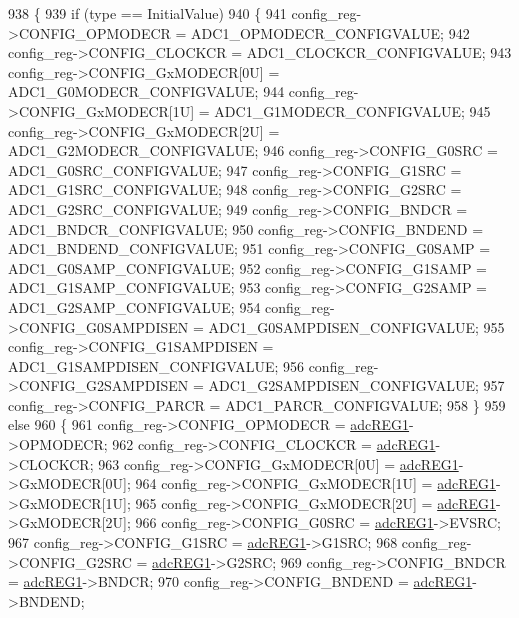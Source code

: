 \begin{DoxyCode}
938 \{
939     \textcolor{keywordflow}{if} (type == InitialValue)
940     \{
941         config\_reg->CONFIG\_OPMODECR = ADC1\_OPMODECR\_CONFIGVALUE;
942         config\_reg->CONFIG\_CLOCKCR = ADC1\_CLOCKCR\_CONFIGVALUE;
943         config\_reg->CONFIG\_GxMODECR[0U] = ADC1\_G0MODECR\_CONFIGVALUE;
944         config\_reg->CONFIG\_GxMODECR[1U] = ADC1\_G1MODECR\_CONFIGVALUE;
945         config\_reg->CONFIG\_GxMODECR[2U] = ADC1\_G2MODECR\_CONFIGVALUE;
946         config\_reg->CONFIG\_G0SRC = ADC1\_G0SRC\_CONFIGVALUE;
947         config\_reg->CONFIG\_G1SRC = ADC1\_G1SRC\_CONFIGVALUE;
948         config\_reg->CONFIG\_G2SRC = ADC1\_G2SRC\_CONFIGVALUE;
949         config\_reg->CONFIG\_BNDCR = ADC1\_BNDCR\_CONFIGVALUE;
950         config\_reg->CONFIG\_BNDEND = ADC1\_BNDEND\_CONFIGVALUE;
951         config\_reg->CONFIG\_G0SAMP = ADC1\_G0SAMP\_CONFIGVALUE;
952         config\_reg->CONFIG\_G1SAMP = ADC1\_G1SAMP\_CONFIGVALUE;
953         config\_reg->CONFIG\_G2SAMP = ADC1\_G2SAMP\_CONFIGVALUE;
954         config\_reg->CONFIG\_G0SAMPDISEN = ADC1\_G0SAMPDISEN\_CONFIGVALUE;
955         config\_reg->CONFIG\_G1SAMPDISEN = ADC1\_G1SAMPDISEN\_CONFIGVALUE;
956         config\_reg->CONFIG\_G2SAMPDISEN = ADC1\_G2SAMPDISEN\_CONFIGVALUE;
957         config\_reg->CONFIG\_PARCR = ADC1\_PARCR\_CONFIGVALUE;
958     \}
959     \textcolor{keywordflow}{else}
960     \{
961         config\_reg->CONFIG\_OPMODECR = \mbox{\hyperlink{reg__adc_8h_a3b9540af9f841ba3127f14b1c9208c57}{adcREG1}}->OPMODECR;
962         config\_reg->CONFIG\_CLOCKCR = \mbox{\hyperlink{reg__adc_8h_a3b9540af9f841ba3127f14b1c9208c57}{adcREG1}}->CLOCKCR;
963         config\_reg->CONFIG\_GxMODECR[0U] = \mbox{\hyperlink{reg__adc_8h_a3b9540af9f841ba3127f14b1c9208c57}{adcREG1}}->GxMODECR[0U];
964         config\_reg->CONFIG\_GxMODECR[1U] = \mbox{\hyperlink{reg__adc_8h_a3b9540af9f841ba3127f14b1c9208c57}{adcREG1}}->GxMODECR[1U];
965         config\_reg->CONFIG\_GxMODECR[2U] = \mbox{\hyperlink{reg__adc_8h_a3b9540af9f841ba3127f14b1c9208c57}{adcREG1}}->GxMODECR[2U];
966         config\_reg->CONFIG\_G0SRC = \mbox{\hyperlink{reg__adc_8h_a3b9540af9f841ba3127f14b1c9208c57}{adcREG1}}->EVSRC;
967         config\_reg->CONFIG\_G1SRC = \mbox{\hyperlink{reg__adc_8h_a3b9540af9f841ba3127f14b1c9208c57}{adcREG1}}->G1SRC;
968         config\_reg->CONFIG\_G2SRC = \mbox{\hyperlink{reg__adc_8h_a3b9540af9f841ba3127f14b1c9208c57}{adcREG1}}->G2SRC;
969         config\_reg->CONFIG\_BNDCR = \mbox{\hyperlink{reg__adc_8h_a3b9540af9f841ba3127f14b1c9208c57}{adcREG1}}->BNDCR;
970         config\_reg->CONFIG\_BNDEND = \mbox{\hyperlink{reg__adc_8h_a3b9540af9f841ba3127f14b1c9208c57}{adcREG1}}->BNDEND;

\end{DoxyCode}

